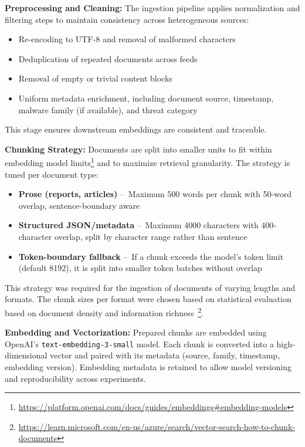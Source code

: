\vspace{0.5em}
\noindent\textbf{Preprocessing and Cleaning:} The ingestion pipeline applies
normalization and filtering steps to maintain consistency across heterogeneous
sources:
\begin{itemize}
      \item Re-encoding to UTF-8 and removal of malformed characters
      \item Deduplication of repeated documents across feeds
      \item Removal of empty or trivial content blocks
      \item Uniform metadata enrichment, including document source, timestamp, malware family (if available),
            and threat category
\end{itemize}
This stage ensures downstream embeddings are consistent and traceable.

\vspace{0.5em}
\noindent\textbf{Chunking Strategy:} Documents are split into smaller units to fit within embedding
model limits\footnote{\url{https://platform.openai.com/docs/guides/embeddings\#embedding-models}}
and to maximize retrieval granularity. The strategy is tuned per document type:

\begin{itemize}
      \item \textbf{Prose (reports, articles)} --~Maximum 500 words per chunk with
            50-word overlap, sentence-boundary aware
      \item \textbf{Structured JSON/metadata} --~Maximum 4000 characters with
            400-character overlap, split by character range rather than sentence
      \item \textbf{Token-boundary fallback} --~If a chunk exceeds the model’s token
            limit (default 8192), it is split into smaller token batches without overlap
\end{itemize}
This strategy was required for the ingestion of documents of varying lengths and formats. The chunk
sizes per format were chosen based on statistical evaluation based on document density and information
richness~\footnote{\url{https://learn.microsoft.com/en-us/azure/search/vector-search-how-to-chunk-documents}}.

\vspace{0.5em}
\noindent\textbf{Embedding and Vectorization:} Prepared chunks are embedded
using OpenAI’s \texttt{text-embedding-3-small} model. Each chunk is converted
into a high-dimensional vector and paired with its metadata (source, family,
timestamp, embedding version). Embedding metadata is retained to allow model
versioning and reproducibility across experiments.

